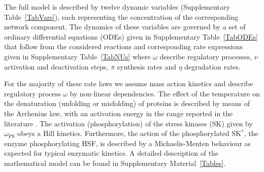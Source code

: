 \documentclass[oneside, 10pt, a4paper, twocolumn]{article}
\begin{document}
The full model is described by twelve dynamic variables (Supplementary Table~\ref{TabVars}), 
each representing the concentration of the corresponding network component. 
The dynamics of these variables are governed by a set of ordinary differential equations (ODEs) given in Supplementary Table~\ref{TabODEs} that follow from the considered reactions and corresponding rate expressions given in Supplementary Table~\ref{TabNUs} where $\omega$ describe regulatory processes,  $\nu$ activation and deactivation steps,  $\pi$ synthesis rates and
 $\eta$ degradation rates.
  
For the majority of these rate laws we assume mass action kinetics and describe regulatory process $\omega$ by  non-linear dependencies. The effect of the temperature on the denaturation (unfolding or misfolding) of proteins is described by means of the Arrhenius law, with an activation energy 
in the range reported in the literature \cite{Bischof2006,He2003}. The activation (phosphorylation) of the stress kinases (SK) given by $\omega_\textrm{PS}$ obeys a Hill kinetics. Furthermore, the action of the phosphorylated SK$^*$, the enzyme phosphorylating HSF, is described by a Michaelis-Menten behaviour as expected for typical enzymatic kinetics. A detailed description of the mathematical model can be found in Supplementary Material~\ref{Tables}.
\end{document}
